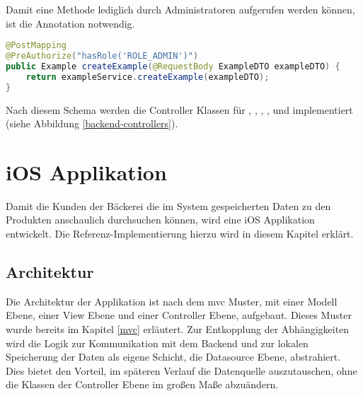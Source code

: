 Damit eine Methode lediglich durch Administratoren aufgerufen werden können, ist die Annotation  notwendig.
\begin{lstlisting}[language=Java]
@PostMapping
@PreAuthorize("hasRole('ROLE_ADMIN')")
public Example createExample(@RequestBody ExampleDTO exampleDTO) {
	return exampleService.createExample(exampleDTO);
}
\end{lstlisting}

Nach diesem Schema werden die Controller Klassen für , , , ,  und  implementiert (siehe Abbildung \ref{backend-controllers}). 

\clearpage


\clearpage

\section{iOS Applikation}
Damit die Kunden der Bäckerei die im System gespeicherten Daten zu den Produkten anschaulich durchsuchen können, wird eine iOS Applikation entwickelt.
Die Referenz-Implementierung hierzu wird in diesem Kapitel erklärt.

\subsection{Architektur}
Die Architektur der Applikation ist nach dem \gls{mvc} Muster, mit einer Modell Ebene, einer View Ebene und einer Controller Ebene, aufgebaut. Dieses Muster wurde bereits im Kapitel \ref{mvc} erläutert.
Zur Entkopplung der Abhängigkeiten wird die Logik zur Kommunikation mit dem Backend und zur lokalen Speicherung der Daten als eigene Schicht, die Datasource Ebene, abstrahiert.
Dies bietet den Vorteil, im späteren Verlauf die Datenquelle auszutauschen, ohne die Klassen der Controller Ebene im großen Maße abzuändern. 

